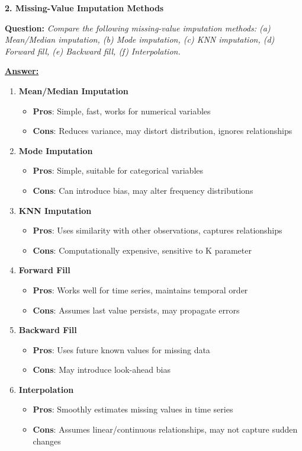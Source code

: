 \documentclass[11pt,a4paper]{article}
\newcommand{\questiontitle}[2]{%
    \vspace{0.4cm}%
    \noindent\textbf{\large\color{headerblue}#1. #2}\par\vspace{0.15cm}%
}
\newcommand{\qprompt}[1]{%
    \noindent\textbf{Question:} \textit{#1}\par\vspace{0.2cm}%
}
\newcommand{\answer}{\noindent\textbf{\underline{Answer:}}\par\vspace{0.15cm}}
\begin{document}
\questiontitle{2}{Missing-Value Imputation Methods}
\qprompt{Compare the following missing-value imputation methods: (a) Mean/Median imputation, (b) Mode imputation, (c) KNN imputation, (d) Forward fill, (e) Backward fill, (f) Interpolation.}
\answer
\begin{enumerate}[label=\textbf{(\alph*)}]
    \item \textbf{Mean/Median Imputation}
    \begin{itemize}
        \item \textbf{Pros}: Simple, fast, works for numerical variables
        \item \textbf{Cons}: Reduces variance, may distort distribution, ignores relationships
    \end{itemize}

    \item \textbf{Mode Imputation}
    \begin{itemize}
        \item \textbf{Pros}: Simple, suitable for categorical variables
        \item \textbf{Cons}: Can introduce bias, may alter frequency distributions
    \end{itemize}

    \item \textbf{KNN Imputation}
    \begin{itemize}
        \item \textbf{Pros}: Uses similarity with other observations, captures relationships
        \item \textbf{Cons}: Computationally expensive, sensitive to K parameter
    \end{itemize}

    \item \textbf{Forward Fill}
    \begin{itemize}
        \item \textbf{Pros}: Works well for time series, maintains temporal order
        \item \textbf{Cons}: Assumes last value persists, may propagate errors
    \end{itemize}

    \item \textbf{Backward Fill}
    \begin{itemize}
        \item \textbf{Pros}: Uses future known values for missing data
        \item \textbf{Cons}: May introduce look-ahead bias
    \end{itemize}

    \item \textbf{Interpolation}
    \begin{itemize}
        \item \textbf{Pros}: Smoothly estimates missing values in time series
        \item \textbf{Cons}: Assumes linear/continuous relationships, may not capture sudden changes
    \end{itemize}
\end{enumerate}
\end{document}
